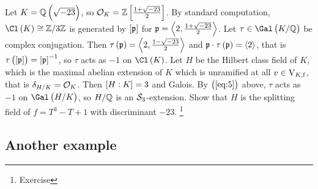 \begin{example*}
Let $ K = \QQ\br{\sqrt{-23}} $, so $ \OOO_K = \ZZ\sbr{\tfrac{1 + \sqrt{-23}}{2}} $. By standard computation, $ \Cl\br{K} \cong \ZZ / 3\ZZ $ is generated by $ \sbr{\ppp} $ for $ \mathfrak{p} = \left\langle 2, \tfrac{1 + \sqrt{-23}}{2} \right\rangle $. Let $ \tau \in \Gal\br{K / \QQ} $ be complex conjugation. Then $ \tau\br{\ppp} = \abr{2, \tfrac{1 - \sqrt{-23}}{2}} $ and $ \ppp \cdot \tau\br{\ppp} = \abr{2} $, that is $ \tau\br{\sbr{\ppp}} = \sbr{\ppp}^{-1} $, so $ \tau $ acts as $ -1 $ on $ \Cl\br{K} $. Let $ H $ be the Hilbert class field of $ K $, which is the maximal abelian extension of $ K $ which is unramified at all $ v \in \mathrm{V}_{K, \mathrm{f}} $, that is $ \delta_{H / K} = \mathcal{O}_K $. Then $ \sbr{H : K} = 3 $ and Galois. By $ \br{\ref{eq:5}} $ above, $ \tau $ acts as $ -1 $ on $ \Gal\br{H / K} $, so $ H / \mathbb{Q} $ is an $ \mathcal{S}_3 $-extension. Show that $ H $ is the splitting field of $ f = T^3 - T + 1 $ with discriminant $ -23 $. \footnote{Exercise}
\end{example*}

\pagebreak

\subsection{Another example}



